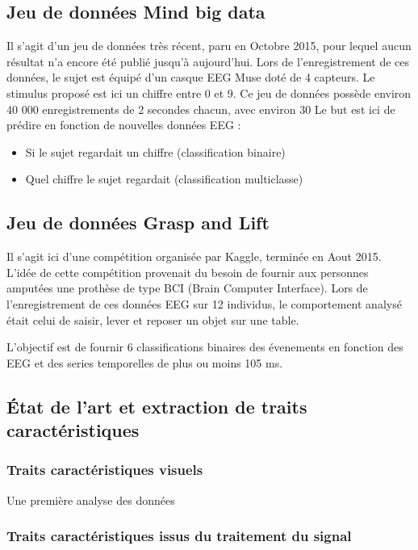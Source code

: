 \documentclass{article} %
\begin{document}
\subsection{Jeu de données Mind big data}

Il s’agit d’un jeu de données très récent, paru en Octobre 2015, pour lequel aucun résultat n’a encore été publié jusqu’à aujourd’hui. Lors de l’enregistrement de ces données, le sujet est équipé d’un casque EEG Muse doté de 4 capteurs. Le stimulus proposé est ici un chiffre entre 0 et 9.
Ce jeu de données possède environ 40 000 enregistrements de 2 secondes chacun, avec environ 30%
Le but est ici de prédire en fonction de nouvelles données EEG :

\begin{itemize}
\item Si le sujet regardait un chiffre (classification binaire)
\item Quel chiffre le sujet regardait (classification multiclasse)
\end{itemize}


\subsection{Jeu de données Grasp and Lift}

Il s’agit ici d’une compétition organisée par Kaggle, terminée en Aout 2015. L’idée de cette compétition provenait du besoin de fournir aux personnes amputées une prothèse de type BCI (Brain Computer Interface). Lors de l’enregistrement de ces données EEG sur 12 individus, le comportement analysé était celui de saisir, lever et reposer un objet sur une table.

L’objectif est de fournir 6 classifications binaires des évenements en fonction des EEG et des series temporelles de plus ou moins 105 ms.

\subsection{\'Etat de l'art et extraction de traits caractéristiques}

\subsubsection{Traits caractéristiques visuels}

Une première analyse des données 

\subsubsection{Traits caractéristiques issus du traitement du signal}
\end{document}
